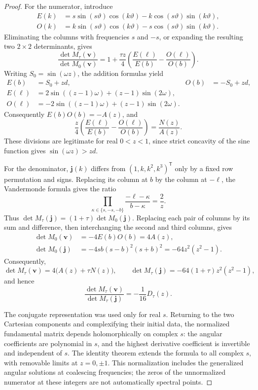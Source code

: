 \begin{proof}
For the numerator, introduce
\[
\begin{aligned}
E(k)&=s\sin(s\vartheta)\cos(k\vartheta)-k\cos(s\vartheta)\sin(k\vartheta),\\
O(k)&=k\sin(s\vartheta)\cos(k\vartheta)-s\cos(s\vartheta)\sin(k\vartheta).
\end{aligned}
\]
Eliminating the columns with frequencies $s$ and $-s$, or expanding the resulting two $2\times2$ determinants, gives
\[
\frac{\det M_\tau(\boldsymbol v)}{\det M_0(\boldsymbol v)}
=1+\frac{\tau z}{4}\left(\frac{E(\ell)}{E(b)}-\frac{O(\ell)}{O(b)}\right).
\]
Writing $S_0=\sin(\omega z)$, the addition formulas yield
\[
\begin{aligned}
E(b)&=S_0+zd,& O(b)&=-S_0+zd,\\
E(\ell)&=2\sin((z-1)\omega)+(z-1)\sin(2\omega),\\
O(\ell)&=-2\sin((z-1)\omega)+(z-1)\sin(2\omega).
\end{aligned}
\]
Consequently $E(b)O(b)=-A(z)$, and
\[
\frac z4\left(\frac{E(\ell)}{E(b)}-\frac{O(\ell)}{O(b)}\right)=\frac{N(z)}{A(z)}.
\]
These divisions are legitimate for real $0<z<1$, since strict concavity of the sine function gives $\sin(\omega z)>zd$.

For the denominator, $\boldsymbol j(k)$ differs from $(1,k,k^2,k^3)^{\mathsf T}$ only by a fixed row permutation and signs. Replacing its column at $b$ by the column at $-\ell$, the Vandermonde formula gives the ratio
\[
\prod_{\kappa\in\{s,-s,-b\}}\frac{-\ell-\kappa}{b-\kappa}=\frac2z.
\]
Thus $\det M_\tau(\boldsymbol j)=(1+\tau)\det M_0(\boldsymbol j)$.
Replacing each pair of columns by its sum and difference, then interchanging the second and third columns, gives
\[
\begin{aligned}
\det M_0(\boldsymbol v)&=-4E(b)O(b)=4A(z),\\
\det M_0(\boldsymbol j)&=-4sb(s-b)^2(s+b)^2=-64z^2(z^2-1).
\end{aligned}
\]
Consequently,
\[
\det M_\tau(\boldsymbol v)=4\bigl(A(z)+\tau N(z)\bigr),\qquad
\det M_\tau(\boldsymbol j)=-64(1+\tau)z^2(z^2-1),
\]
and hence
\[
\frac{\det M_\tau(\boldsymbol v)}{\det M_\tau(\boldsymbol j)}
=-\frac1{16}D_\tau(z).
\]

The conjugate representation was used only for real $s$. Returning to the two Cartesian components and complexifying their initial data, the normalized fundamental matrix depends holomorphically on complex $s$: the angular coefficients are polynomial in $s$, and the highest derivative coefficient is invertible and independent of $s$. The identity theorem extends the formula to all complex $s$, with removable limits at $z=0,\pm1$. This normalization includes the generalized angular solutions at coalescing frequencies; the zeros of the unnormalized numerator at these integers are not automatically spectral points.
\end{proof}

